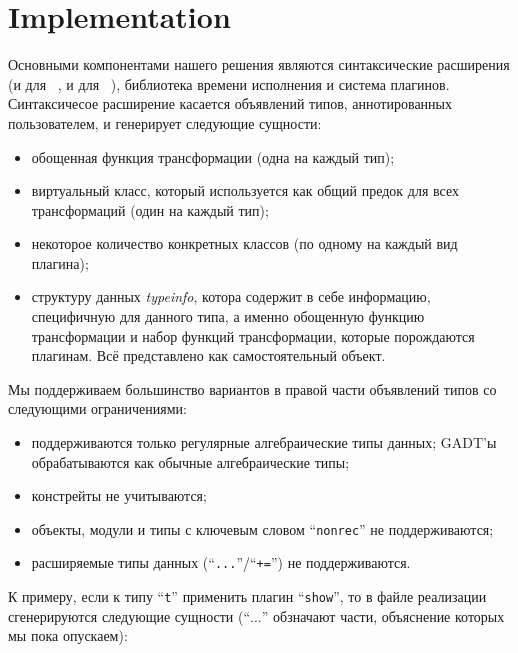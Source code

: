 \section{Implementation}
\label{sec:implementation}

Основными компонентами нашего решения являются синтаксические расширения (и для ~\cite{Camlp5}, и для  ~\cite{PPXLib}), библиотека времени исполнения и система плагинов. Синтаксичесое расширение касается объявлений типов, аннотированных пользователем, и генерирует следующие сущности:


\begin{itemize}
\item обощенная функция трансформации (одна на каждый тип);
\item виртуальный класс, который используется как общий предок для всех трансформаций (один на каждый тип);
\item некоторое количество конкретных классов (по одному на каждый вид плагина);
\item структуру данных \emph{typeinfo}, котора содержит в себе информацию, специфичную для данного типа, а именно обощенную функцию трансформации и набор функций трансформации, которые порождаются плагинам. Всё представлено как самостоятельный объект.
\end{itemize}

Мы поддерживаем большинство вариантов в правой части объявлений типов со следующими ограничениями:

\begin{itemize}
\item поддерживаются только регулярные алгебраические типы данных; GADT'ы обрабатываются как обычные алгебраические типы;
\item констрейты не учитываются;
\item объекты, модули и типы с ключевым словом ``\lstinline{nonrec}'' не поддерживаются;
\item расширяемые типы данных (``\lstinline{...}''/``\lstinline{+=}'') не поддерживаются.
\end{itemize}

К примеру, если к типу ``\lstinline{t}'' применить плагин ``\lstinline{show}'', то в файле реализации сгенерируются следующие сущности (``$\dots$'' обзначают части, объяснение которых мы пока опускаем):

